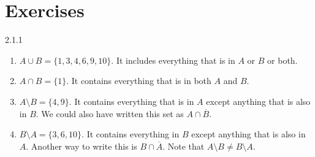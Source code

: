 \documentclass[11pt,]{book}
\theoremstyle{ptxplainnotitle}
\theoremstyle{ptxplaintitle}
\theoremstyle{ptxdefinitionnotitle}
\theoremstyle{ptxdefinitiontitle}
\theoremstyle{ptxdefinitionnotitle}
\theoremstyle{ptxdefinitiontitle}
\theoremstyle{ptxdefinitionnotitle}
\theoremstyle{ptxdefinitiontitle}
\theoremstyle{ptxdefinitiontitlenonumber}
\theoremstyle{ptxdefinitiontitlenonumber}
\numberwithin{equation}{chapter}
\renewcommand{\bar}{\overline}
\begin{document}
\section*{Exercises}
\begin{divisionexercise}{2.1.1}
\textbf{}\hypertarget{p-790}{}%
\leavevmode%
\begin{enumerate}[label=(\alph*)]
\item\hypertarget{li-345}{}\hypertarget{p-791}{}%
\(A \cup B = \{1,3,4,6,9,10\}\text{.}\)  It includes everything that is in \(A\) or \(B\) or both.%
\item\hypertarget{li-346}{}\hypertarget{p-792}{}%
\(A \cap B = \{1\}\text{.}\)  It contains everything that is in both \(A\) and \(B\text{.}\)%
\item\hypertarget{li-347}{}\hypertarget{p-793}{}%
\(A \setminus B = \{4, 9\}\text{.}\)  It contains everything that is in \(A\) except anything that is also in \(B\text{.}\)  We could also have written this set as \(A \cap \bar{B}\text{.}\)%
\item\hypertarget{li-348}{}\hypertarget{p-794}{}%
\(B \setminus A = \{3, 6, 10\}\text{.}\) It contains everything in \(B\) except anything that is also in \(A\text{.}\)  Another way to write this is \(B \cap \bar{A}\text{.}\)  Note that \(A \setminus B \ne B \setminus A\text{.}\)%
\end{enumerate}
%
\end{divisionexercise}%
\end{document}

